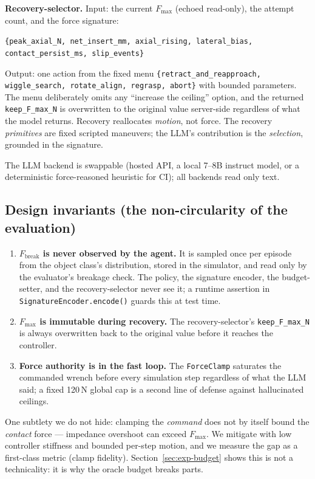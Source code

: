 \documentclass[11pt]{article}
\newcommand{\Fmax}{\ensuremath{F_{\max}}}
\newcommand{\Fbreak}{\ensuremath{F_{\mathrm{break}}}}
\newcommand{\code}[1]{\texttt{\small #1}}
\begin{document}
\textbf{Recovery-selector.} Input: the current \Fmax{} (echoed read-only), the attempt count, and the force signature:
\begin{center}
\code{\{peak\_axial\_N, net\_insert\_mm, axial\_rising, lateral\_bias, contact\_persist\_ms, slip\_events\}}
\end{center}
Output: one action from the fixed menu
\code{\{retract\_and\_reapproach, wiggle\_search, rotate\_align, regrasp, abort\}}
with bounded parameters. The menu deliberately omits any ``increase the ceiling'' option, and the returned \code{keep\_F\_max\_N} is overwritten to the original value server-side regardless of what the model returns. Recovery reallocates \emph{motion}, not force. The recovery \emph{primitives} are fixed scripted maneuvers; the LLM's contribution is the \emph{selection}, grounded in the signature.

The LLM backend is swappable (hosted API, a local 7--8B instruct model, or a deterministic force-reasoned heuristic for CI); all backends read only text.

\subsection{Design invariants (the non-circularity of the evaluation)}
\label{sec:invariants}

\begin{enumerate}
  \item \textbf{\Fbreak{} is never observed by the agent.} It is sampled once per episode from the object class's distribution, stored in the simulator, and read only by the evaluator's breakage check. The policy, the signature encoder, the budget-setter, and the recovery-selector never see it; a runtime assertion in \code{SignatureEncoder.encode()} guards this at test time.
  \item \textbf{\Fmax{} is immutable during recovery.} The recovery-selector's \code{keep\_F\_max\_N} is always overwritten back to the original value before it reaches the controller.
  \item \textbf{Force authority is in the fast loop.} The \code{ForceClamp} saturates the commanded wrench before every simulation step regardless of what the LLM said; a fixed 120\,N global cap is a second line of defense against hallucinated ceilings.
\end{enumerate}

One subtlety we do not hide: clamping the \emph{command} does not by itself bound the \emph{contact} force --- impedance overshoot can exceed \Fmax{}. We mitigate with low controller stiffness and bounded per-step motion, and we measure the gap as a first-class metric (clamp fidelity). Section~\ref{sec:exp-budget} shows this is not a technicality: it is why the oracle budget breaks parts.
\end{document}
